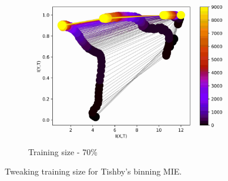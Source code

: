 \documentclass[dissertation.tex]{subfiles}
\begin{document}
\begin{figure}[ht]
\begin{subfigure}[t]{0.32\textwidth}
    \centering
    \includegraphics[width=\textwidth]{figs/eval/trainingSize/Binning70.jpg}
    \caption{
      Training size - 70\%
    }
    \label{figBinningTS70}
  \end{subfigure}
  \caption{
      Tweaking training size for Tishby's binning MIE.
    }
  \label{figTS}
\end{figure}
\end{document}
